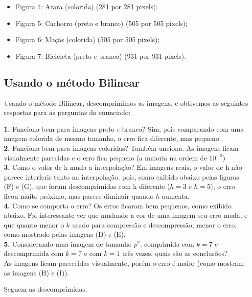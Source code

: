 \documentclass[12pt,letterpaper]{article}
\begin{document}
	\begin{itemize}
		\item Figura 4: Arara (colorida) (281 por 281 pixels);
		\item Figura 5: Cachorro (preto e branco) (505 por 505 pixels);
		\item Figura 6: Maçãs (colorida) (505 por 505 pixels);
		\item Figura 7: Bicicleta (preto e branco) (931 por 931 pixels).
	\end{itemize}
	
	\subsection{Usando o método Bilinear}
	
	Usando o método Bilinear, descomprimimos as imagens, e obtivemos as seguintes respostas para as perguntas do enunciado:
	
	\textbf{1.} Funciona bem para imagens preto e branco?
	Sim, pois comparando com uma imagem colorida de mesmo tamanho, o erro fica diferente, mas pequeno.\\
	
	\textbf{2.} Funciona bem para imagens coloridas?
	Também unciona. As imagens ficam visualmente parecidas e o erro fica pequeno (a maioria na ordem de $10^{-2}$)\\
	
	\textbf{3.} Como o valor de h muda a interpolação? 
	Em imagens reais, o valor de h não parece interferir tanto na interpolação, pois, como exibido abaixo pelas figuras (F) e (G), que foram descomprimidas com h diferente ($h = 3$ e $h = 5$), o erro ficou muito próximo, mas parece diminuir quando $h$ aumenta.\\
	
	\textbf{4.} Como se comporta o erro?
	Os erros ficaram bem pequenos, como exibido abaixo. Foi interessante ver que mudando a cor de uma imagem seu erro muda, e que quanto menor o $k$ usado para compressão e descompressão, menor o erro, como mostrado pelas imagens (D) e (E). \\
	
	\textbf{5.} Considerando uma imagem de tamanho $p^2$, comprimida com $k = 7$ e descomprimida com $k = 7$ e com $k = 1$ três vezes, quais são as conclusões?\\
	As imagens ficam pareceidas visualmente, porém o erro é maior (como mostram as imagens (H) e (I)).
	
	Seguem as descomprimidas:
	
\end{document}
